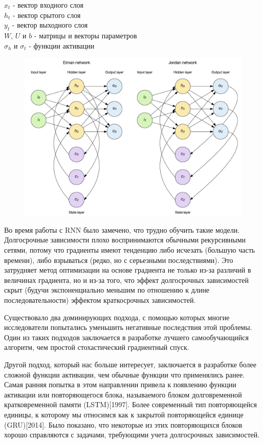 \documentclass[a4paper,12pt]{article}
\begin{document}
	\begin{tabbing}
		$x_t$ - вектор входного слоя \\
		$h_t$ - вектор срытого слоя \\
		$y_t$ - вектор выходного слоя \\
		$W$, $U$ и $b$ - матрицы и векторы параметров \\
		$\sigma_h$ и $\sigma_t$ - функции активации
	\end{tabbing}
	
	\begin{figure}[ht!]
		\centering
		\captionsetup{justification=centering}
		\includegraphics[width=140mm]{img/RNN.png}
	\end{figure}
	
	Во время работы с RNN было замечено, что трудно обучить такие модели. Долгосрочные зависимости плохо воспринимаются обычными рекурсивными сетями, потому что градиенты имеют тенденцию либо исчезать (большую часть времени), либо взрываться (редко, но с серьезными последствиями). Это затрудняет метод оптимизации на основе градиента не только из-за различий в величинах градиента, но и из-за того, что эффект долгосрочных зависимостей скрыт (будучи экспоненциально меньшим по отношению к длине последовательности) эффектом
	краткосрочных зависимостей. 
	
	Существовало два доминирующих подхода, с помощью которых многие исследователи попытались уменьшить негативные последствия этой проблемы. Один из таких подходов заключается в разработке лучшего самообучающийся алгоритм, чем простой стохастический градиентный спуск.
	
	Другой подход, который нас больше интересует, заключается в разработке более сложной функции активации, чем обычные функции что применялись ранее. Самая ранняя попытка в этом направлении привела к появлению функции активации или повторяющегося блока, называемого блоком долговременной кратковременной памяти (LSTM)[1997]. Более современный тип повторяющейся единицы, к которому мы относимся как к закрытой повторяющейся единице (GRU)[2014]. Было показано, что некоторые из этих повторяющихся блоков хорошо справляются с задачами, требующими учета долгосрочных зависимостей.
	
\end{document}
